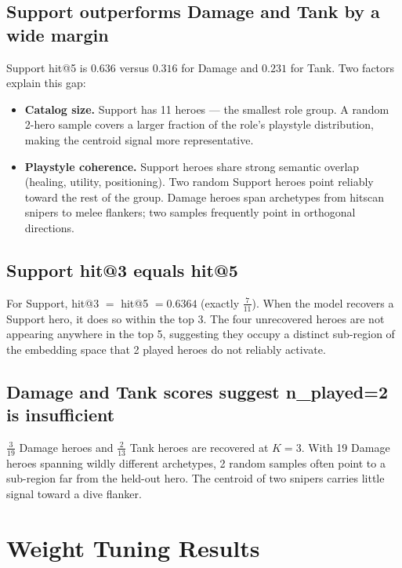 \documentclass[11pt, a4paper]{article}
\begin{document}
\subsection{Support outperforms Damage and Tank by a wide margin}

Support hit@5 is $0.636$ versus $0.316$ for Damage and $0.231$ for Tank.
Two factors explain this gap:

\begin{itemize}[leftmargin=1.5em]
  \item \textbf{Catalog size.}  Support has 11 heroes — the smallest role group.
        A random 2-hero sample covers a larger fraction of the role's playstyle
        distribution, making the centroid signal more representative.

  \item \textbf{Playstyle coherence.}  Support heroes share strong semantic
        overlap (healing, utility, positioning).  Two random Support heroes
        point reliably toward the rest of the group.  Damage heroes span
        archetypes from hitscan snipers to melee flankers; two samples
        frequently point in orthogonal directions.
\end{itemize}

\subsection{Support hit@3 equals hit@5}

For Support, hit@3 $=$ hit@5 $= 0.6364$ (exactly $\frac{7}{11}$).  When the
model recovers a Support hero, it does so within the top 3.  The four
unrecovered heroes are not appearing anywhere in the top 5, suggesting they
occupy a distinct sub-region of the embedding space that 2 played heroes do not
reliably activate.

\subsection{Damage and Tank scores suggest n\_played=2 is insufficient}

$\frac{3}{19}$ Damage heroes and $\frac{2}{13}$ Tank heroes are recovered at
$K=3$.  With 19 Damage heroes spanning wildly different archetypes, 2 random
samples often point to a sub-region far from the held-out hero.  The centroid
of two snipers carries little signal toward a dive flanker.

\section{Weight Tuning Results}
\end{document}
